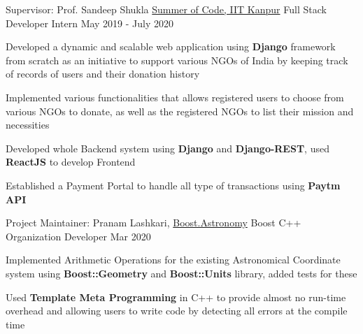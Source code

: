 \begin{cventries}

  \cventry
    {Supervisor: Prof. Sandeep Shukla }
    {\href{https://github.com/RohitRanjangit/One_Rupee}{Summer of Code, IIT Kanpur}}
    {Full Stack Developer Intern}
    {May 2019 - July 2020}
    {
      \begin{cvitems}
        \item{Developed a dynamic and scalable web application using \textbf{Django} framework from scratch as an initiative to support various NGOs of India by keeping track of records of users and their donation history}
        \item{Implemented various functionalities that allows registered users to choose from various NGOs to donate, as well as the registered NGOs to list their mission and necessities}
        \item{Developed whole Backend system using \textbf{Django} and \textbf{Django-REST}, used \textbf{ReactJS} to develop Frontend}
        \item{Established a Payment Portal to handle all type of transactions using \textbf{Paytm API}}
      \end{cvitems}
    }  

  \cventry
    {Project Maintainer: Pranam Lashkari, \href{https://github.com/BoostGSoC19/astronomy/pulls}{Boost.Astronomy}}
    {Boost C++ Organization}
    {Developer}
    {Mar 2020}
    {
      \begin{cvitems}
        \item{Implemented Arithmetic Operations for the existing Astronomical Coordinate system using \textbf{Boost::Geometry} and \textbf{Boost::Units} library, added tests for these}
        \item {Used \textbf{Template Meta Programming} in C++ to provide almost no run-time overhead and allowing users to write code by detecting all errors at the compile time}
        
      \end{cvitems}
    }

\end{cventries}

